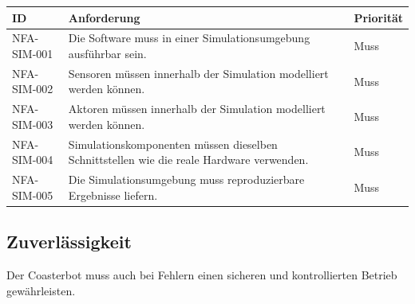\documentclass[
  a4paper,
  12pt,
  DIV=12,        %
  parskip=half,  %
  headings=small %
]{scrartcl}
\theoremstyle{definition}
\theoremstyle{definition}
\begin{document}
\begin{longtable}[]{@{}
  >{\raggedright\arraybackslash}p{}
  >{\raggedright\arraybackslash}p{}
  >{\raggedright\arraybackslash}p{}@{}}
\toprule\noalign{}
\begin{minipage}[b]{\linewidth}\raggedright
ID
\end{minipage} & \begin{minipage}[b]{\linewidth}\raggedright
Anforderung
\end{minipage} & \begin{minipage}[b]{\linewidth}\raggedright
Priorität
\end{minipage} \\
\midrule\noalign{}
\endhead
\bottomrule\noalign{}
\endlastfoot
NFA-SIM-001 & Die Software muss in einer Simulationsumgebung ausführbar
sein. & Muss \\
NFA-SIM-002 & Sensoren müssen innerhalb der Simulation modelliert werden
können. & Muss \\
NFA-SIM-003 & Aktoren müssen innerhalb der Simulation modelliert werden
können. & Muss \\
NFA-SIM-004 & Simulationskomponenten müssen dieselben Schnittstellen wie
die reale Hardware verwenden. & Muss \\
NFA-SIM-005 & Die Simulationsumgebung muss reproduzierbare Ergebnisse
liefern. & Muss \\
\end{longtable}

\subsection{Zuverlässigkeit}\label{zuverluxe4ssigkeit}

Der Coasterbot muss auch bei Fehlern einen sicheren und kontrollierten
Betrieb gewährleisten.
\end{document}
